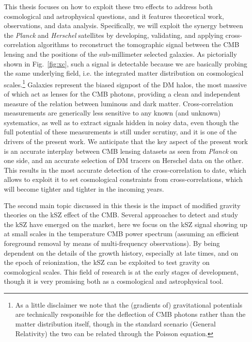 This thesis focuses on how to exploit these two effects to address both cosmological and astrophysical questions, and it features theoretical work, observations, and data analysis. Specifically, we will exploit the synergy between the \textit{Planck} and \textit{Herschel} satellites by developing, validating, and applying cross-correlation algorithms to reconstruct the tomographic signal between the CMB lensing and the positions of the sub-millimeter selected galaxies. As pictorially shown in Fig.~\ref{fig:xc}, such a signal is detectable because we are basically probing the same underlying field, i.e. the integrated matter distribution on cosmological scales.\footnote{As a little disclaimer we note that the (gradients of) gravitational potentials are technically responsible for the deflection of CMB photons rather than the matter distribution itself, though in the standard scenario (General Relativity) the two can be related through the Poisson equation.} Galaxies represent the biased signpost of the DM halos, the most massive of which act as lenses for the CMB photons, providing a clean and independent measure of the relation between luminous and dark matter. Cross-correlation measurements are generically less sensitive to any known (and unknown) systematics, as well as to extract signals hidden in noisy data, even though the full potential of these measurements is still under scrutiny, and it is one of the drivers of the present work. We anticipate that the key aspect of the present work is an accurate interplay between CMB lensing datasets as seen from \textit{Planck} on one side, and an accurate selection of DM tracers on Herschel data on the other. This results in the most accurate detection of the cross-correlation to date, which allows to exploit it to set cosmological constraints from cross-correlations, which will become tighter and tighter in the incoming years. 

The second main topic discussed in this thesis is the impact of modified gravity theories on the kSZ effect of the CMB. Several approaches to detect and study the kSZ have emerged on the market, here we focus on the kSZ signal showing up at small scales in the temperature CMB power spectrum (assuming an efficient foreground removal by means of multi-frequency observations). By being dependent on the details of the growth history, especially at late times, and on the epoch of reionization, the kSZ can be exploited to test gravity on cosmological scales. This field of research is at the early stages of development, though it is very promising both as a cosmological and astrophysical tool. 

